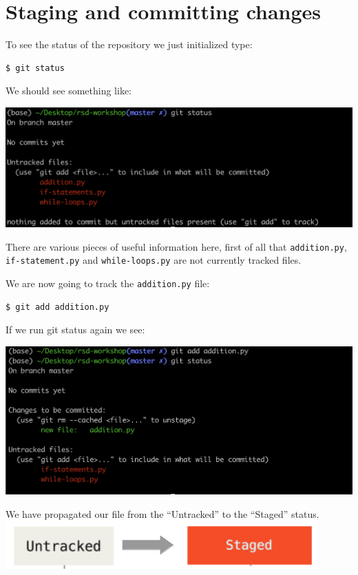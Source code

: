 \documentclass[11pt]{article}
\begin{document}
    \hypertarget{staging-and-committing-changes}{%
\section{Staging and committing
changes}\label{staging-and-committing-changes}}

To see the status of the repository we just initialized type:

\begin{verbatim}
$ git status
\end{verbatim}

We should see something like:

\includegraphics{static/git_status.png}

    There are various pieces of useful information here, first of all that
\texttt{addition.py}, \texttt{if-statement.py} and
\texttt{while-loops.py} are not currently tracked files.

We are now going to track the \texttt{addition.py} file:

\begin{verbatim}
$ git add addition.py
\end{verbatim}

If we run git status again we see:

\includegraphics{static/git_status_after_add.png}

    We have propagated our file from the ``Untracked'' to the ``Staged''
status.\\
\includegraphics{static/staged.png}
\end{document}

